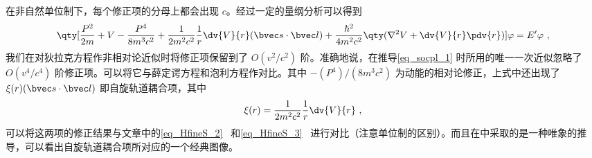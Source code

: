 在非自然单位制下，每个修正项的分母上都会出现 $c$。经过一定的量纲分析可以得到
\begin{equation}\label{eq_socpl_4}
\qty[\frac{P^2}{2m}+V-\frac{P^4}{8m^3c^2}+\frac{1}{2m^2c^2}\frac{1}{r}\dv{V}{r}(\bvec s\cdot \bvec l)+\frac{\hbar^2}{4m^2c^2}\qty(\nabla^2 V+\dv{V}{r}\pdv{r})]\varphi = E'\varphi~,
\end{equation}
我们在对狄拉克方程作非相对论近似时将修正项保留到了 $O(v^2/c^2)$ 阶。准确地说，在推导\autoref{eq_socpl_1} 时所用的唯一一次近似忽略了 $O(v^4/c^4)$ 阶修正项。可以将它与薛定谔方程和泡利方程作对比。其中 $-(P^4)/(8m^3c^2)$ 为动能的相对论修正，上式中还出现了 $\xi(r)(\bvec s\cdot \bvec l)$ 即自旋轨道耦合项，其中
\begin{equation}
\xi(r)=\frac{1}{2m^2c^2}\frac{1}{r}\dv{V}{r}~,
\end{equation}
可以将这两项的修正结果与文章中的\autoref{eq_HfineS_2}~ 和\autoref{eq_HfineS_3}~ 进行对比（注意单位制的区别）。而且在中采取的是一种唯象的推导，可以看出自旋轨道耦合项所对应的一个经典图像。

